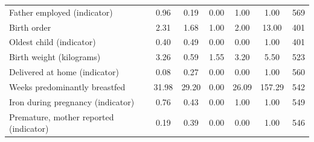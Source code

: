 \documentclass[12pt]{article}
\begin{document}
\begin{table}[H]
{\begin{tabular}{l*{6}{c}}
Father employed (indicator)&        0.96&        0.19&        0.00&        1.00&        1.00&         569\\
Birth order         &        2.31&        1.68&        1.00&        2.00&       13.00&         401\\
Oldest child (indicator)&        0.40&        0.49&        0.00&        0.00&        1.00&         401\\
Birth weight (kilograms)&        3.26&        0.59&        1.55&        3.20&        5.50&         523\\
Delivered at home (indicator)&        0.08&        0.27&        0.00&        0.00&        1.00&         560\\
Weeks predominantly breastfed&       31.98&       29.20&        0.00&       26.09&      157.29&         542\\
Iron during pregnancy (indicator)&        0.76&        0.43&        0.00&        1.00&        1.00&         549\\
Premature, mother reported (indicator)&        0.19&        0.39&        0.00&        0.00&        1.00&         546\\

\bottomrule
\end{tabular}}%
\makebox[\textwidth][c]{\usebox{\tblbox}}%
\end{table}
\clearpage
\noindent
\end{document}
